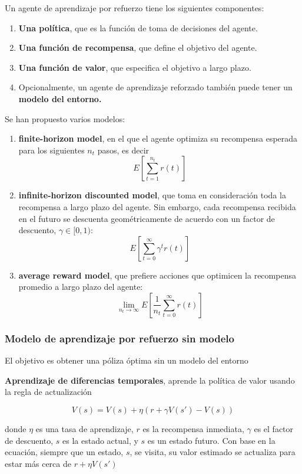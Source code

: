 \documentclass[
	11pt, %
]{beamer}
\begin{document}
\begin{frame}
  
  Un agente de aprendizaje por refuerzo tiene los siguientes componentes:

  \bigskip %
  
  \begin{enumerate}
  \item \textbf{Una política}, que es la función de toma de decisiones del agente. 
  \item \textbf{Una función de recompensa}, que define el objetivo del agente.
  \item \textbf{Una función de valor}, que especifica el objetivo a largo plazo.
  \item Opcionalmente, un agente de aprendizaje reforzado también puede tener un \textbf{modelo del entorno.}
  \end{enumerate}
      
\end{frame}

\begin{frame}

  Se han propuesto varios modelos:

  \begin{enumerate}
  \item \textbf{finite-horizon model}, en el que el agente optimiza su recompensa esperada para los siguientes $n_t$ pasos, es decir \[ E \left[ \sum_{t=1} ^{n_{t}} r(t) \right]\]
  \item \textbf{infinite-horizon discounted model}, que toma en consideración toda la recompensa a largo plazo del agente. Sin embargo, cada recompensa recibida en el futuro se descuenta geométricamente de acuerdo con un factor de descuento, $\gamma \in [0, 1)$: \[ E \left[ \sum_{t=0} ^{\infty} \gamma^{t} r(t) \right]\]
  \item \textbf{average reward model}, que prefiere acciones que optimicen la recompensa promedio a largo plazo del agente: \[ \lim_{n_{t}\to\infty} E \left[ \frac{1}{n_{t}}\sum_{t=0} ^{\infty} r(t) \right]\]
  \end{enumerate}
  
\end{frame}

\begin{frame}

  \frametitle{Modelo de aprendizaje por refuerzo sin modelo}

  El objetivo es obtener una póliza óptima sin un modelo del entorno

  \bigskip %
  
  \textbf{Aprendizaje de diferencias temporales}, aprende la política de valor usando la regla de actualización

  \[ V(s) = V(s) + \eta (r+\gamma V(s') - V(s))\]

  donde $\eta$ es una tasa de aprendizaje, $r$ es la recompensa inmediata, $\gamma$ es el factor de descuento, $s$ es la estado actual, y $s$ es un estado futuro. Con base en la ecuación, siempre que un estado, $s$, se visita, su valor estimado se actualiza para estar más cerca de $r + \eta V(s')$
  
\end{frame}
\end{document}

